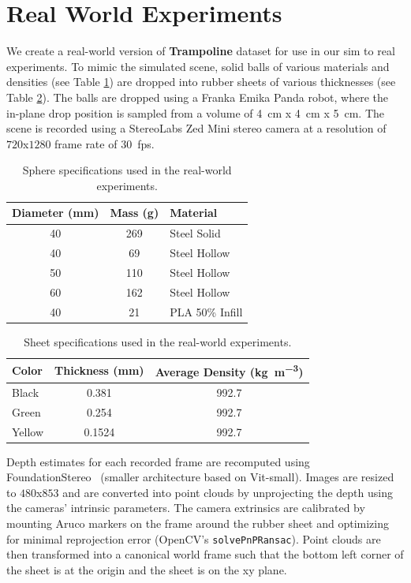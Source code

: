 \section{Real World Experiments} \label{app:real}

We create a real-world version of \textbf{Trampoline} dataset for use in our sim to real experiments.
To mimic the simulated scene, solid balls of various materials and densities (see Table \ref{tab:real_spheres}) are dropped into rubber sheets of various thicknesses (see Table \ref{tab:real_sheets}).
The balls are dropped using a Franka Emika Panda robot, where the in-plane drop position is sampled from a volume of \SI{4}{\cm} x \SI{4}{\cm} x \SI{5}{\cm}.
The scene is recorded using a StereoLabs Zed Mini stereo camera at a resolution of $720$x$1280$ frame rate of \SI{30}{fps}.

\begin{table}[ht]
\centering
\begin{tabular}{c c l}
\toprule
\textbf{Diameter} (\si{\mm}) & \textbf{Mass} (\si{\g}) & \textbf{Material} \\
\midrule
40 & 269 & Steel Solid \\
40 & 69  & Steel Hollow \\
50 & 110 & Steel Hollow \\
60 & 162 & Steel Hollow \\
40 & 21  & PLA 50\% Infill \\
\bottomrule
\end{tabular}
\vspace{0.1cm}
\caption{Sphere specifications used in the real-world experiments.}
\label{tab:real_spheres}
\end{table}

\begin{table}[ht]
\centering
\begin{tabular}{l c c}
\toprule
\textbf{Color} & \textbf{Thickness} (\si{\mm}) & \textbf{Average Density} (\si{\kg\per\m\cubed}) \\
\midrule
Black  & 0.381  & 992.7 \\
Green  & 0.254  & 992.7 \\
Yellow & 0.1524 & 992.7 \\
\bottomrule
\end{tabular}
\vspace{0.1cm}
\caption{Sheet specifications used in the real-world experiments.}
\label{tab:real_sheets}
\end{table}

Depth estimates for each recorded frame are recomputed using FoundationStereo~\citep{FoundationStereo} (smaller architecture based on Vit-small).
Images are resized to $480$x$853$ and are converted into point clouds by unprojecting the depth using the cameras' intrinsic parameters.
The camera extrinsics are calibrated by mounting Aruco markers on the frame around the rubber sheet and optimizing for minimal reprojection error (OpenCV's \texttt{solvePnPRansac}).
Point clouds are then transformed into a canonical world frame such that the bottom left corner of the sheet is at the origin and the sheet is on the xy plane.

